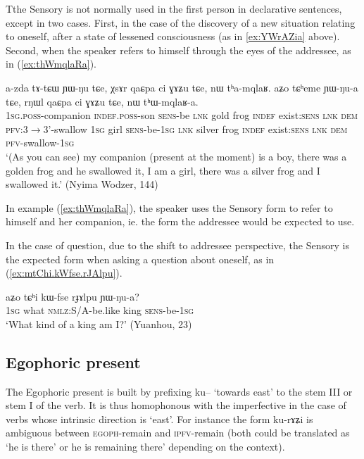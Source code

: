 \documentclass[oldfontcommands,oneside,a4paper,11pt]{article}
\newcommand{\ipa}[1]{{\phon \mbox{#1}}} %
\newcommand{\refb}[1]{(\ref{#1})}
\begin{document}
Tthe Sensory is not normally used in the first person in declarative sentences, except in two cases. First, in the case of the discovery of a new situation relating to oneself, after a state of lessened consciousness (as in \ref{ex:YWrAZia} above). Second, when the speaker refers to himself through the eyes of the addressee, as in \refb{ex:thWmqlaRa}. 

\begin{exe}
\ex \label{ex:thWmqlaRa}
\gll
\ipa{a-zda}  	\ipa{tɤ-tɕɯ}  	\ipa{ɲɯ-ŋu}  	\ipa{tɕe,}  	\ipa{χsɤr}  	\ipa{qaɕpa}  	\ipa{ci}  	\ipa{ɣɤʑu}  	\ipa{tɕe,}  	\ipa{nɯ}  	\ipa{tʰa-mqlaʁ.} \ipa{aʑo}  	\ipa{tɕʰeme}  	\ipa{ɲɯ-ŋu-a}  	\ipa{tɕe,}  	\ipa{rŋɯl}  	\ipa{qaɕpa}  	\ipa{ci}  	\ipa{ɣɤʑu}  	\ipa{tɕe,}  	\ipa{nɯ}  	\ipa{tʰɯ-mqlaʁ-a.}  \\
\textsc{1sg.poss}-companion \textsc{indef.poss}-son \textsc{sens}-be  \textsc{lnk} gold frog \textsc{indef} exist:\textsc{sens} \textsc{lnk} \textsc{dem} \textsc{pfv}:3$\rightarrow$3'-swallow \textsc{1sg} girl \textsc{sens}-be-\textsc{1sg}  \textsc{lnk} silver frog \textsc{indef} exist:\textsc{sens} \textsc{lnk} \textsc{dem} \textsc{pfv}-swallow-\textsc{1sg} \\
\glt `(As you can see) my companion (present at the moment) is a boy, there was a golden frog and he swallowed it, I am a girl, there was a silver frog and I swallowed it.' (Nyima Wodzer, 144)
\end{exe}

In example \refb{ex:thWmqlaRa}, the speaker uses the Sensory form to refer to himself and her companion, ie. the form the addressee would be expected to use. 

In the case of question, due to the shift to addressee perspective, the Sensory is the expected form when asking a question about oneself, as in \refb{ex:mtChi.kWfse.rJAlpu}.


\begin{exe}
\ex \label{ex:mtChi.kWfse.rJAlpu}
\gll
\ipa{aʑo}  	\ipa{tɕʰi}  	\ipa{kɯ-fse}  	\ipa{rɟɤlpu}  	\ipa{ɲɯ-ŋu-a?}  \\
\textsc{1sg} what \textsc{nmlz}:S/A-be.like king \textsc{sens}-be-\textsc{1sg} \\
\glt `What kind of a king am I?' (Yuanhou, 23)
\end{exe}

\subsection{Egophoric present } \label{sec:egoph}
The Egophoric present  is built by prefixing \ipa{ku--} `towards east' to the stem III or stem I of the verb. It is thus homophonous with the imperfective in the case of verbs whose intrinsic direction is `east'.  For instance the form \ipa{ku-rɤʑi} is ambiguous between \textsc{egoph}-remain and \textsc{ipfv}-remain (both could be translated as `he is there' or he is remaining there' depending on the context).
\end{document}
